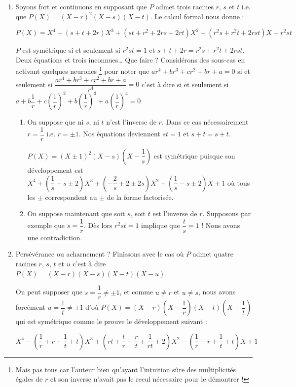 \begin{enumerate}
	
	\item Soyons fort et continuons en supposant que $P$ admet trois racines $r$, $s$ et $t$ i.e. que $P(X) = (X - r)^2 (X - s) (X - t)$.
	Le calcul formal nous donne :
	
	\noindent
	$P(X) = X^4
	      - (s + t + 2 r) X^3
	      + (s t + r^2 + 2 r s + 2 r t) X^2
	      - (r^2 s + r^2 t + 2 r s t) X 
	      + r^2 s t$
	       	
	\noindent
	$P$ est symétrique si et seulement si
	$r^2 s t = 1$ et $s + t + 2 r = r^2 s + r^2 t + 2 r s t$.
	Deux équations et trois inconnues\dots{} Que faire ? Considérons des sous-cas en activant quelques neurones
	\footnote{
		Mais pas tous car l'auteur bien qu'ayant l'intuition \og sûre \fg{} des multiplicités égales de $r$ et son inverse n'avait pas le recul nécessaire pour le démontrer !
	}
	pour noter que
	$a r^4 + b r^3 + c r^2 + b r + a = 0$
	si et seulement si
	$\dfrac{a r^4 + b r^3 + c r^2 + b r + a}{r^4} = 0$
	c'est à dire si et seulement si
	$a + b \dfrac1r + c \left( \dfrac1r \right)^2 + b \left( \dfrac1r \right)^3 + a \left( \dfrac1r \right)^4 = 0$
	\begin{enumerate}
		\item On suppose que ni $s$, ni $t$ n'est l'inverse de $r$. Dans ce cas nécessairement $r = \dfrac1r$ i.e. $r = \pm 1$.
		Nos équations deviennent
		$s t = 1$ et $s + t = s + t$.
		
		\noindent
		$P(X) = (X \pm 1)^2 (X - s) \left( X - \dfrac1s \right)$
		est symétrique puisque son développement est
		$ X^4
		+ \left( \dfrac1s - s \pm 2 \right) X^3
		+ \left( - \dfrac2s + 2 \pm 2 s \right) X^2
		+ \left( \dfrac1s - s \pm 2 \right) X
		+ 1$
		où tous les $\pm$ \og correspondent \fg{} au $\pm$ de la forme factorisée.	 


		\item On suppose maintenant que soit $s$, soit $t$ est l'inverse de $r$. Supposons par exemple que $s = \dfrac1r$.
		Dès lors $r^2 s t = 1$ implique que $\dfrac{t}{s} = 1$ !
		Nous avons une contradiction. 
	\end{enumerate}

	
	\item Persévérance ou acharnement ? Finissons avec le cas où $P$ admet quatre racines $r$, $s$, $t$ et $u$ c'est à dire $P(X) = (X - r) (X - s) (X - t) (X - u)$.
	
	\noindent
	On peut supposer que $s = \dfrac1r \neq \pm1$, et comme $u \neq r$ et $u \neq s$, nous avons forcément $u = \dfrac1t \neq \pm1$
	d'où
	$P(X) = (X - r) \left( X - \dfrac1r \right) (X - t) \left( X - \dfrac1t \right)$
	qui est symétrique comme le prouve le développement suivant :
		
	\noindent
	$ X^4
	- \left( \dfrac1r + r + \dfrac1t + t \right) X^3
	+ \left( r t + \dfrac{t}{r} + \dfrac{r}{t} + \dfrac{1}{rt} + 2 \right) X^2
	- \left( \dfrac1r + r + \dfrac1t + t \right) X 
	+ 1$
\end{enumerate}

